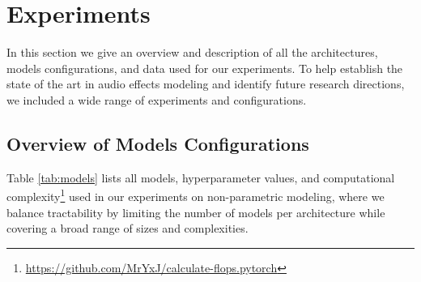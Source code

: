 

\section{Experiments}
\label{sec:experiments}
In this section we give an overview and description of all the architectures, models configurations, and data used for our experiments.
To help establish the state of the art in audio effects modeling and identify future research directions, we included a wide range of experiments and configurations.




\subsection{Overview of Models Configurations}
\label{sec:models_config}
Table \ref{tab:models} lists all models, hyperparameter values, and computational complexity\footnote{\url{https://github.com/MrYxJ/calculate-flops.pytorch}} used in our experiments on non-parametric modeling, where we balance tractability by limiting the number of models per architecture while covering a broad range of sizes and complexities.

